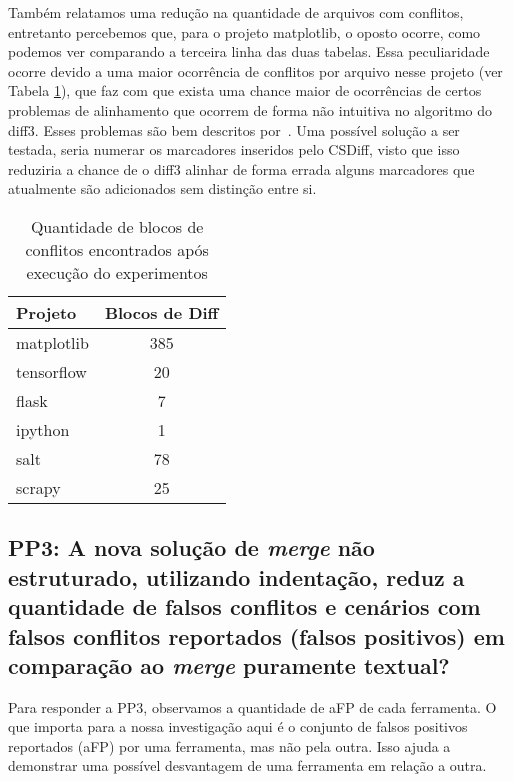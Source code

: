 Também relatamos uma redução na quantidade de arquivos com conflitos, entretanto percebemos que,
para o projeto matplotlib, o oposto ocorre, como podemos ver comparando a terceira linha das duas tabelas. Essa peculiaridade
ocorre devido a uma maior ocorrência de conflitos por arquivo nesse projeto (ver Tabela \ref{block_diff}), que faz com que
exista uma chance maior de ocorrências de certos problemas de alinhamento que ocorrem de forma não intuitiva no algoritmo do
diff3. Esses problemas são bem descritos por~\cite{khan07}. Uma possível solução a ser testada, seria numerar os marcadores
inseridos pelo CSDiff, visto que isso reduziria a chance de o diff3 alinhar de forma errada alguns marcadores que atualmente
são adicionados sem distinção entre si.

\begin{table}[ht]
	\begin{center}
		\begin{tabular}{|l|c|}
			\hline
			\textbf{Projeto} & \textbf{Blocos de Diff} \\
			\hline
			matplotlib       & 385                     \\
			tensorflow       & 20                      \\
			flask            & 7                       \\
			ipython          & 1                       \\
			salt             & 78                      \\
			scrapy           & 25                      \\
			\hline
		\end{tabular}
	\end{center}
	\caption{Quantidade de blocos de conflitos encontrados após execução do experimentos}\label{block_diff}
\end{table}

\subsection{PP3: A nova solução de \emph{merge} não estruturado, utilizando indentação,
	reduz a quantidade de falsos conflitos e cenários com falsos conflitos reportados
	(falsos positivos) em comparação ao \emph{merge} puramente textual?}
Para responder a PP3, observamos a quantidade de aFP de cada ferramenta.
O que importa para a nossa investigação aqui é o conjunto de falsos positivos reportados (aFP)
por uma ferramenta, mas não pela outra. Isso ajuda a demonstrar uma possível desvantagem de
uma ferramenta em relação a outra.

